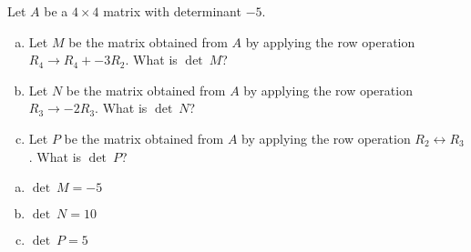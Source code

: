 
\begin{exerciseStatement}


Let \(A\) be a \(4 \times 4\) matrix with determinant \( -5 \).


\begin{enumerate}[(a)]
\item Let \(M\) be the matrix obtained from \(A\) by applying the row operation \( R_4 \to R_4 + -3R_2 \). What is \(\operatorname{det}\ M\)?
\item Let \(N\) be the matrix obtained from \(A\) by applying the row operation \( R_3 \to -2R_3 \). What is \(\operatorname{det}\ N\)?
\item Let \(P\) be the matrix obtained from \(A\) by applying the row operation \( R_2 \leftrightarrow R_3 \). What is \(\operatorname{det}\ P\)?
\end{enumerate}
    
\end{exerciseStatement}
    
\begin{exerciseAnswer} 

\begin{enumerate}[(a)]
\item \(\operatorname{det}\ M= -5 \)
\item \(\operatorname{det}\ N= 10 \)
\item \(\operatorname{det}\ P= 5 \)
\end{enumerate}
    
\end{exerciseAnswer}
    
